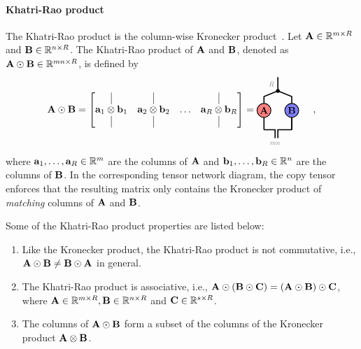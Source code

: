 \paragraph{Khatri-Rao product}
The Khatri-Rao product is the column-wise Kronecker product~\citep{smilde2005multi,bro1998multi}. Let $\mathbf{A}\in\mathbb{R}^{m\times R}$ and $\mathbf{B}\in\mathbb{R}^{n\times R}$. The Khatri-Rao product of $\mathbf{A}$ and $\mathbf{B}$, denoted as $\mathbf{A}\odot\mathbf{B}\in\mathbb{R}^{mn\times R}$, is defined by
\begin{align*}
    \def\baseline{-0.5ex}
    \Ab\krao\Bb =
    \begin{bmatrix}
    \vline & \vline  &   & \vline \\
    \ab_1\kron\bb_1 & \ab_2\kron\bb_2 & \dots & \ab_R\kron\bb_R\\
    \vline & \vline & & \vline 
    \end{bmatrix}
=
    \begin{tikzpicture}[baseline=\baseline]
    \tikzset{tensor/.style = {minimum size = 0.5cm,shape = circle,thick,draw=black,inner sep = 0pt}, edge/.style   = {thick,line width=.4mm},every loop/.style={}}
    \def\y{0}
    \def\x{0}
    \node[tensor,fill=red!50!white] (A) at (\x,\y){$\Ab$};
    \node[tensor,fill=blue!50!white] (B) at (\x+1,\y){$\Bb$};
    \draw[edge] (\x,\y+0.25) -- (\x,\y+0.5) -- (\x+0.5,\y+0.7);
    \draw[edge] (\x+1,\y+0.25) -- (\x+1,\y+0.5) -- (\x+0.5,\y+0.7);
    \draw[edge] (\x+0.5,\y+0.7) -- (\x+0.5,\y+1.2) node [left, midway] {\edgelabel{$R$}};
    \draw  node[fill = black,circle,inner sep=0pt,minimum size=4pt] (m) at (\x+0.5,\y+0.7) {};
    \draw[edge] (\x,\y-0.25) -- (\x,\y-0.7);
    \draw[edge] (\x+1,\y-0.25) -- (\x+1,\y-0.7);
    \draw[edge] (\x+1,\y-0.7) -- (\x+0.5,\y-0.7) -- (\x+0.5,\y-1);
    \draw[edge] (\x+1,\y-0.25) -- (\x+1,\y-0.7);
    \draw[edge] (\x,\y-0.7) -- (\x+0.4,\y-0.7) -- (\x+0.4,\y-1)node [below] {\edgelabel{$mn$}};
    \end{tikzpicture}\hspace{0.5cm},
\end{align*}
where $\mathbf{a}_1,\dots,\mathbf{a}_R\in\mathbb{R}^{m}$ are the columns of $\mathbf{A}$ and $\mathbf{b}_1,\dots,\mathbf{b}_R\in\mathbb{R}^{n}$ are the columns of $\mathbf{B}$.  In the corresponding tensor network diagram, the copy tensor enforces that the resulting matrix only contains the Kronecker product of \emph{matching} columns of $\mathbf{A}$ and $\mathbf{B}$. 
\begin{remark}
Some of the Khatri-Rao product properties are listed below:
\begin{enumerate}
\item Like the Kronecker product, the Khatri-Rao product is not commutative, i.e., $\mathbf{A}\odot\mathbf{B}\neq \mathbf{B}\odot\mathbf{A}$ in general.
\item The Khatri-Rao product is associative, i.e., $\mathbf{A}\odot(\mathbf{B}\odot\mathbf{C})=(\mathbf{A}\odot\mathbf{B})\odot\mathbf{C}$, where $\mathbf{A}\in\mathbb{R}^{m\times R},\mathbf{B}\in\mathbb{R}^{n\times R}$ and $\mathbf{C}\in\mathbb{R}^{s\times R}$.
\item The columns of $\mathbf{A}\odot\mathbf{B}$ form a subset of the columns of the Kronecker product $\mathbf{A}\otimes \mathbf{B}$.
\end{enumerate}
\end{remark}

